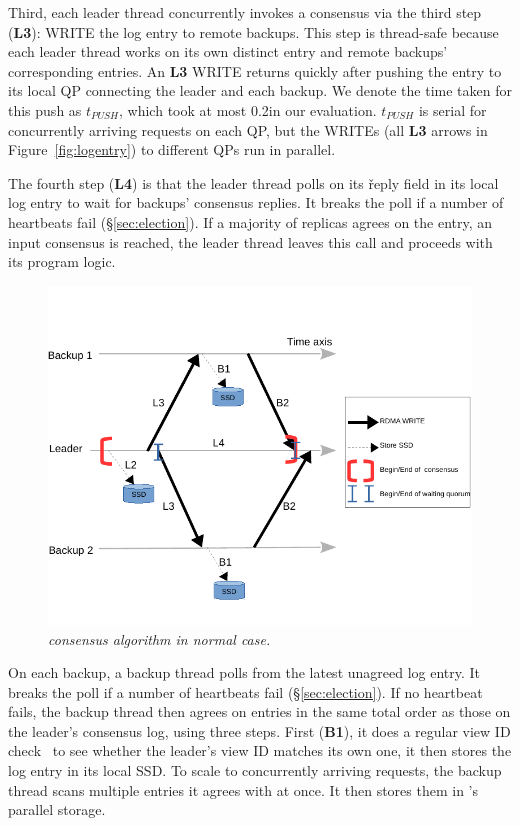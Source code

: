 Third, each leader thread concurrently invokes a consensus via the third step 
(\textbf{L3}): WRITE the log entry to remote backups. This step is thread-safe 
because each leader thread works on its own distinct entry and remote backups' 
corresponding entries. An \textbf{L3} WRITE returns quickly after 
pushing the entry to its local QP connecting the leader and each backup. We 
denote the time taken for this push as $t_{PUSH}$, which took at most 0.2\us in 
our evaluation. $t_{PUSH}$ is serial for concurrently arriving requests 
on each QP, but the WRITEs (all \textbf{L3} arrows in 
Figure~\ref{fig:logentry}) to different QPs run in parallel.

The fourth step (\textbf{L4}) is that the leader thread polls on its 
\v{reply} field in its local log entry to wait for backups' consensus replies. 
It breaks the poll if a number of heartbeats fail 
(\S\ref{sec:election}). If a majority of replicas agrees on the entry, an input 
consensus is reached, the 
leader thread leaves this \recv call and proceeds with its program logic.

\begin{figure}[ht]
\begin{center}
\includegraphics{figures/consensus}
\caption{\em \xxx consensus algorithm in normal case.}\label{fig:consensus}
\end{center}
\end{figure}

On each backup, a backup thread polls from the latest unagreed log entry. It 
breaks the poll if a number of heartbeats fail 
(\S\ref{sec:election}). 
If no heartbeat fails, the backup thread then agrees on entries in the same 
total order as those on the leader's consensus log, using three steps. First 
(\textbf{B1}), it does a regular \paxos view ID check~\cite{paxos:practical} to 
see whether the leader's view ID matches its own one, it then stores the log 
entry in its local SSD. To scale to concurrently arriving requests, the backup 
thread scans multiple entries it agrees with at once. It then stores them 
in \xxx's parallel storage.

